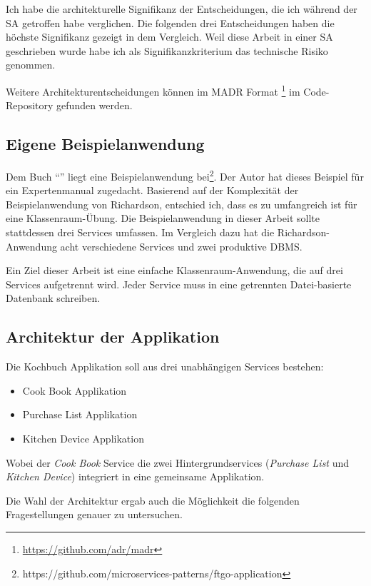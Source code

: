 Ich habe die architekturelle Signifikanz der Entscheidungen, die ich während der SA getroffen habe verglichen. Die folgenden drei Entscheidungen haben die höchste Signifikanz gezeigt in dem Vergleich. Weil diese Arbeit in einer SA geschrieben wurde habe ich als Signifikanzkriterium das technische Risiko genommen.

Weitere Architekturentscheidungen können im MADR Format \footnote{\url{https://github.com/adr/madr}} im Code-Repository gefunden werden.

\subsection{Eigene Beispielanwendung}
Dem  Buch \enquote{}\cite{Richardson2018} liegt eine Beispielanwendung bei\footnote{https://github.com/microservices-patterns/ftgo-application}. Der Autor hat dieses Beispiel für ein Expertenmanual zugedacht. Basierend auf der Komplexität der Beispielanwendung von Richardson, entschied ich, dass es zu umfangreich ist für eine Klassenraum-Übung. Die Beispielanwendung in dieser Arbeit sollte stattdessen drei Services umfassen. Im Vergleich dazu hat die Richardson-Anwendung acht verschiedene Services und zwei produktive \ac{DBMS}.

Ein Ziel dieser Arbeit ist eine einfache Klassenraum-Anwendung, die auf drei Services aufgetrennt wird. Jeder Service muss in eine getrennten Datei-basierte Datenbank schreiben. 

\subsection{Architektur der Applikation}
Die Kochbuch Applikation soll aus drei unabhängigen Services bestehen:

\begin{itemize}
    \item Cook Book Applikation
    \item Purchase List Applikation
    \item Kitchen Device Applikation
\end{itemize}

Wobei der \textit{Cook Book} Service die zwei Hintergrundservices (\textit{Purchase List} und \textit{Kitchen Device}) integriert in eine gemeinsame Applikation. 

Die Wahl der Architektur ergab auch die Möglichkeit die folgenden Fragestellungen genauer zu untersuchen.

